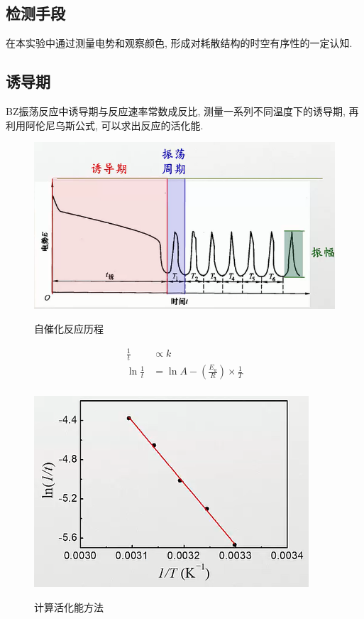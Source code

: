 \documentclass[a4paper]{article}
\begin{document}
\subsection{检测手段}
在本实验中通过测量电势和观察颜色, 形成对耗散结构的时空有序性的一定认知.
\subsection{诱导期}
BZ振荡反应中诱导期与反应速率常数成反比, 测量一系列不同温度下的诱导期, 
再利用阿伦尼乌斯公式, 可以求出反应的活化能.\\
\begin{figure}[!h]
	\centering
	\includegraphics[width=0.30\paperwidth]{fig/time.png}\\
	\caption{自催化反应历程}\label{wf}
\end{figure}
\begin{equation}
	\begin{aligned}
		\frac{1}{t} &\propto k\\
		\ln{\frac{1}{t}} &= \ln{A} - (\frac{E_{a}}{R})\times \frac{1}{T}\\
	\end{aligned}
\end{equation}
\begin{figure}[!h]
	\centering
	\includegraphics[width=0.30\paperwidth]{fig/energy.png}\\
	\caption{计算活化能方法}\label{wf}
\end{figure}
\end{document}
